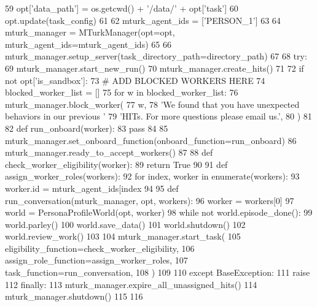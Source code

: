 \begin{DoxyCode}
59         opt[\textcolor{stringliteral}{'data\_path'}] = os.getcwd() + \textcolor{stringliteral}{'/data/'} + opt[\textcolor{stringliteral}{'task'}]
60     opt.update(task\_config)
61 
62     mturk\_agent\_ids = [\textcolor{stringliteral}{'PERSON\_1'}]
63 
64     mturk\_manager = MTurkManager(opt=opt, mturk\_agent\_ids=mturk\_agent\_ids)
65 
66     mturk\_manager.setup\_server(task\_directory\_path=directory\_path)
67 
68     \textcolor{keywordflow}{try}:
69         mturk\_manager.start\_new\_run()
70         mturk\_manager.create\_hits()
71 
72         \textcolor{keywordflow}{if} \textcolor{keywordflow}{not} opt[\textcolor{stringliteral}{'is\_sandbox'}]:
73             \textcolor{comment}{# ADD BLOCKED WORKERS HERE}
74             blocked\_worker\_list = []
75             \textcolor{keywordflow}{for} w \textcolor{keywordflow}{in} blocked\_worker\_list:
76                 mturk\_manager.block\_worker(
77                     w,
78                     \textcolor{stringliteral}{'We found that you have unexpected behaviors in our previous '}
79                     \textcolor{stringliteral}{'HITs. For more questions please email us.'},
80                 )
81 
82         \textcolor{keyword}{def }run\_onboard(worker):
83             \textcolor{keywordflow}{pass}
84 
85         mturk\_manager.set\_onboard\_function(onboard\_function=run\_onboard)
86         mturk\_manager.ready\_to\_accept\_workers()
87 
88         \textcolor{keyword}{def }check\_worker\_eligibility(worker):
89             \textcolor{keywordflow}{return} \textcolor{keyword}{True}
90 
91         \textcolor{keyword}{def }assign\_worker\_roles(workers):
92             \textcolor{keywordflow}{for} index, worker \textcolor{keywordflow}{in} enumerate(workers):
93                 worker.id = mturk\_agent\_ids[index %
94 
95         \textcolor{keyword}{def }run\_conversation(mturk\_manager, opt, workers):
96             worker = workers[0]
97             world = PersonaProfileWorld(opt, worker)
98             \textcolor{keywordflow}{while} \textcolor{keywordflow}{not} world.episode\_done():
99                 world.parley()
100             world.save\_data()
101             world.shutdown()
102             world.review\_work()
103 
104         mturk\_manager.start\_task(
105             eligibility\_function=check\_worker\_eligibility,
106             assign\_role\_function=assign\_worker\_roles,
107             task\_function=run\_conversation,
108         )
109 
110     \textcolor{keywordflow}{except} BaseException:
111         \textcolor{keywordflow}{raise}
112     \textcolor{keywordflow}{finally}:
113         mturk\_manager.expire\_all\_unassigned\_hits()
114         mturk\_manager.shutdown()
115 
116 
\end{DoxyCode}
